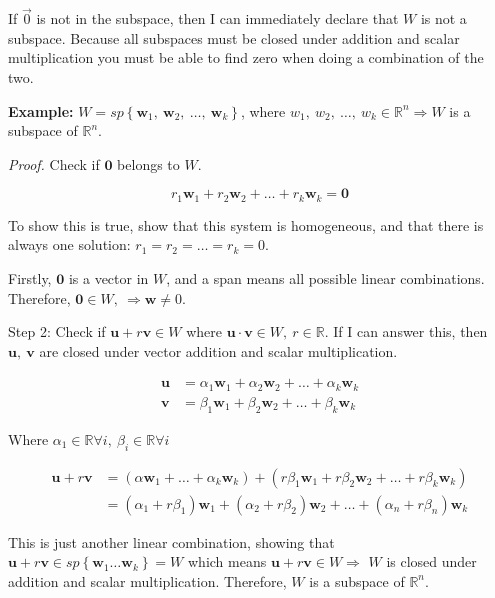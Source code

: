 \documentclass[
]{article}
\begin{document}
If $\overrightarrow{0}$ is not in the subspace, then I can immediately
declare that $W$ is not a subspace. Because all subspaces must be
closed under addition and scalar multiplication you must be able to find
zero when doing a combination of the two.

\textbf{Example:}
$W = sp\left\{ {\mathbf{w}}_{1},\ {\mathbf{w}}_{2},\ \ldots,\ {\mathbf{w}}_{k} \right\}$,
where
$w_{1},\ w_{2},\ \ldots,\ w_{k} \in \mathbb{R}^{n} \Rightarrow W$ is a
subspace of $\mathbb{R}^{n}$.

\emph{Proof.} Check if $\mathbf{0}$ belongs to $W$.

$$r_{1}{\mathbf{w}}_{1} + r_{2}{\mathbf{w}}_{2} + \ldots + r_{k}{\mathbf{w}}_{k} = \mathbf{0}$$

To show this is true, show that this system is homogeneous, and that
there is always one solution: $r_{1} = r_{2} = \ldots = r_{k} = 0$.

Firstly, $\mathbf{0}$ is a vector in $W$, and a span means all
possible linear combinations. Therefore,
$\mathbf{0} \in W,\  \Rightarrow \mathbf{w} \neq 0$.

Step 2: Check if $\mathbf{u} + r\mathbf{v} \in W$ where
$\mathbf{u} \cdot \mathbf{v} \in W,\ r\mathbb{\in R}$. If I
can answer this, then $\mathbf{u},\ \mathbf{v}$ are closed
under vector addition and scalar multiplication.

\begin{align*}
\mathbf{u} &= \alpha_{1}{\mathbf{w}}_{1} + \alpha_{2}{\mathbf{w}}_{2} + \ldots + \alpha_{k}{\mathbf{w}}_{k}
 \\
\mathbf{v} &= \beta_{1}{\mathbf{w}}_{1} + \beta_{2}{\mathbf{w}}_{2} + \ldots + \beta_{k}{\mathbf{w}}_{k}
\end{align*}


Where
$\alpha_{1}\mathbb{\in R\forall}i,\ \beta_{i}\mathbb{\in R\forall}i$

\begin{align*}
\mathbf{u} + r\mathbf{v} &= \left( \alpha{\mathbf{w}}_{1} + \ldots + \alpha_{k}{\mathbf{w}}_{k} \right) + \left( r\beta_{1}{\mathbf{w}}_{1} + r\beta_{2}{\mathbf{w}}_{2} + \ldots + r\beta_{k}{\mathbf{w}}_{k} \right)
 \\
&= \left( \alpha_{1} + r\beta_{1} \right){\mathbf{w}}_{1} + \left( \alpha_{2} + r\beta_{2} \right){\mathbf{w}}_{2} + \ldots + \left( \alpha_{n} + r\beta_{n} \right){\mathbf{w}}_{k}
\end{align*}


This is just another linear combination, showing that
$\mathbf{u} + r\mathbf{v} \in sp\left\{ {\mathbf{w}}_{1}\ldots{\mathbf{w}}_{k} \right\} = W$
which means $\mathbf{u} + r\mathbf{v} \in W \Rightarrow$ $W$
is closed under addition and scalar multiplication. Therefore, $W$ is
a subspace of $\mathbb{R}^{n}$.
\end{document}
